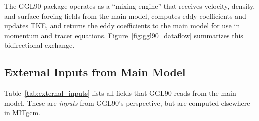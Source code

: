 \documentclass[12pt,letterpaper]{article}
\begin{document}
The GGL90 package operates as a ``mixing engine'' that receives velocity, density, and surface forcing fields from the main model, computes eddy coefficients and updates TKE, and returns the eddy coefficients to the main model for use in momentum and tracer equations. Figure~\ref{fig:ggl90_dataflow} summarizes this bidirectional exchange.

\subsection{External Inputs from Main Model}
\label{app:external_inputs}

Table~\ref{tab:external_inputs} lists all fields that GGL90 reads from the main model. These are \emph{inputs} from GGL90's perspective, but are computed elsewhere in MITgcm.
\end{document}
